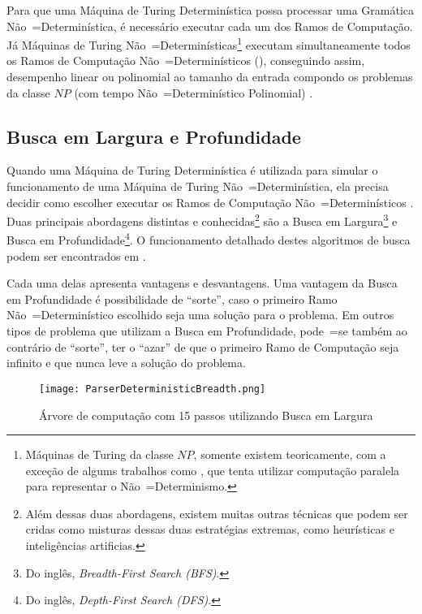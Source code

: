{    Para que uma Máquina de Turing Determinística possa processar uma Gramática Não~=Determinística,
    é necessário executar cada um dos Ramos de Computação.
    Já Máquinas de Turing Não~=Determinísticas\footnote{
    Máquinas de Turing da classe $NP$,
    somente existem teoricamente,
    com a exceção de algums trabalhos como ,
    que tenta utilizar computação paralela para representar o Não~=Determinismo.
    }
    executam simultaneamente todos os Ramos de Computação Não~=Determinísticos (),
    conseguindo assim, desempenho linear ou
    polinomial ao tamanho da entrada compondo os problemas da classe $NP$ (com tempo Não~=Determinístico Polinomial) \cite{hopcroftBook}.


    \subsection{Busca em Largura e Profundidade}
    \label{section:buscaEmLarguraEProfundidade}

    Quando uma Máquina de Turing Determinística é utilizada para simular o funcionamento de uma Máquina de Turing Não~=Determinística,
    ela precisa decidir como escolher executar os Ramos de Computação Não~=Determinísticos \cite{sipserBook}.
    Duas principais abordagens distintas e
    conhecidas\footnote{
    Além dessas duas abordagens,
    existem muitas outras técnicas que podem ser cridas como misturas dessas duas estratégias extremas,
    como heurísticas e inteligências artificias.
    }
    são a Busca em Largura\footnote{
    Do inglês, \textit{Breadth-First Search (BFS)}.
    }
    e Busca em Profundidade\footnote{
    Do inglês, \textit{Depth-First Search (DFS)}.
    }.
    O funcionamento detalhado destes algoritmos de busca podem ser encontrados em .

    Cada uma delas apresenta vantagens e
    desvantagens.
    Uma vantagem da Busca em Profundidade é possibilidade de ``sorte'',
    caso o primeiro Ramo Não~=Determinístico escolhido seja uma solução para o problema.
    Em outros tipos de problema que utilizam a Busca em Profundidade,
    pode~=se também ao contrário de ``sorte'',
    ter o ``azar'' de que o primeiro Ramo de Computação seja infinito e
    que nunca leve a solução do problema.
    \begin{figure}[!htb]
    \caption{Árvore de computação com 15 passos\protect\footnotemark{} utilizando Busca em Largura}
    \label{figure:ParserDeterministicBreadth}
    \centering
    \texttt{[image: ParserDeterministicBreadth.png]}
    \end{figure}

}
